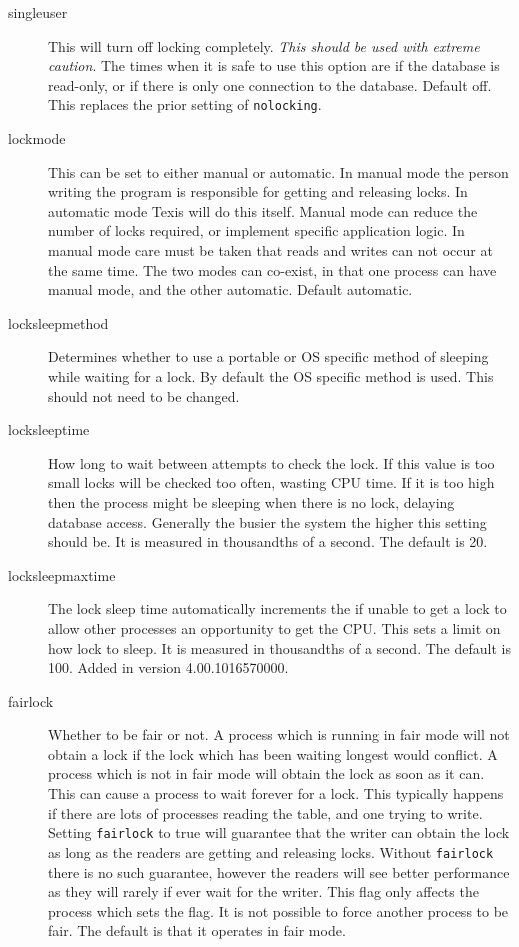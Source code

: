 \begin{description}
\item[singleuser] This will turn off locking completely.  {\em This should
be used with extreme caution}.  The times when it is safe to use this
option are if the database is read-only, or if there is only one
connection to the database.  Default off.  This replaces the prior
setting of \verb`nolocking`.

\item[lockmode] This can be set to either manual or automatic.  In
manual mode the person writing the program is responsible for getting
and releasing locks.  In automatic mode Texis will do this itself.
Manual mode can reduce the number of locks required, or implement
specific application logic.  In manual mode care must be taken that
reads and writes can not occur at the same time.  The two modes can
co-exist, in that one process can have manual mode, and the other
automatic.  Default automatic.

\item[locksleepmethod] Determines whether to use a portable or OS
specific method of sleeping while waiting for a lock.  By default the
OS specific method is used.  This should not need to be changed.

\item[locksleeptime] How long to wait between attempts to check the
lock.  If this value is too small locks will be checked too often,
wasting CPU time.  If it is too high then the process might be
sleeping when there is no lock, delaying database access.  Generally
the busier the system the higher this setting should be.  It is
measured in thousandths of a second.  The default is 20.

\item[locksleepmaxtime] 
The lock sleep time automatically increments the if unable to get a
lock to allow other processes an opportunity to get the CPU.  This
sets a limit on how lock to sleep.
It is measured in thousandths of a second.  The default is 100.
Added in version 4.00.1016570000.

\item[fairlock] Whether to be fair or not.  A process which is running
in fair mode will not obtain a lock if the lock which has been waiting
longest would conflict.  A process which is not in fair mode will
obtain the lock as soon as it can.  This can cause a process to wait
forever for a lock.  This typically happens if there are lots of
processes reading the table, and one trying to write.  Setting
\verb`fairlock` to true will guarantee that the writer can obtain the
lock as long as the readers are getting and releasing locks.  Without
\verb`fairlock` there is no such guarantee, however the readers will
see better performance as they will rarely if ever wait for the
writer.  This flag only affects the process which sets the flag.  It
is not possible to force another process to be fair.  The default is
that it operates in fair mode.


\end{description}
